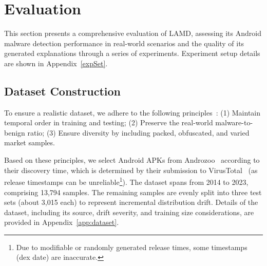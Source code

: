 \section{Evaluation}
This section presents a comprehensive evaluation of LAMD, assessing its Android malware detection performance in real-world scenarios and the quality of its generated explanations through a series of experiments. Experiment setup details are shown in Appendix~\ref{expSet}.




\subsection{Dataset Construction}
To ensure a realistic dataset, we adhere to the following principles~\cite{tesseract}: (1) Maintain temporal order in training and testing; (2) Preserve the real-world malware-to-benign ratio; (3) Ensure diversity by including packed, obfuscated, and varied market samples.

Based on these principles, we select Android APKs from Androzoo~\cite{AndroZoo} according to their discovery time, which is determined by their submission to VirusTotal~\cite{VirusTotal} (as release timestamps can be unreliable\footnote{Due to modifiable or randomly generated release times, some timestamps (dex date) are inaccurate.}). The dataset spans from 2014 to 2023, comprising 13,794 samples. %
The remaining samples are evenly split into three test sets (about 3,015 each) to represent incremental distribution drift. Details of the dataset, including its source, drift severity, and training size considerations, are provided in Appendix~\ref{app:dataset}.

